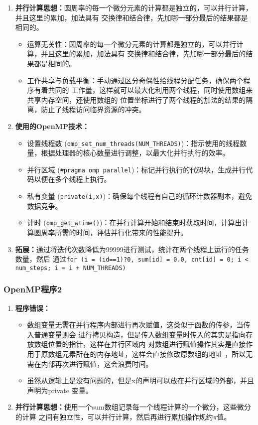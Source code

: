 \documentclass{article}
\begin{document}
\begin{enumerate}
    \item \textbf{并行计算思想：}圆周率的每一个微分元素的计算都是独立的，可以并行计算，并且这里的累加，加法具有
        交换律和结合律，先加哪一部分最后的结果都是相同的。
        \begin{itemize}
            \item 运算无关性：圆周率的每一个微分元素的计算都是独立的，可以并行计算，并且这里的累加，加法具有
            交换律和结合律，先加哪一部分最后的结果都是相同的。
            \item 工作共享与负载平衡：手动通过区分奇偶性给线程分配任务，确保两个程序有着共同的
            工作量，这样就可以最大化利用两个线程，同时使用数组来共享内存空间，还使用数组的
            位置坐标进行了两个线程的加法的结果的隔离，防止了线程访问临界资源的冲突。
        \end{itemize}
    
    \item \textbf{使用的OpenMP技术：}
    \begin{itemize}
        \item 设置线程数 (\texttt{omp\_set\_num\_threads(NUM\_THREADS)})：指示使用的线程数量，根据处理器的核心数量进行调整，以最大化并行执行的效率。
        \item 并行区域 (\texttt{\#pragma omp parallel})：标记并行执行的代码块，生成并行代码以便在多个线程上执行。
        \item 私有变量 (\texttt{private(i,x)})：确保每个线程有自己的循环计数器副本，避免数据竞争。
        \item 计时 (\texttt{omp\_get\_wtime()})：在并行计算开始和结束时获取时间，计算出计算圆周率所需的时间，评估并行化带来的性能提升。
    \end{itemize}
    \item \textbf{拓展：}通过将迭代次数降低为99999进行测试，统计在两个线程上运行的任务数量，然后
    通过\texttt{for (i = (id==1)?0, sum[id] = 0.0, cnt[id] = 0; i < num_steps; i = i + NUM\_THREADS)}
\end{enumerate}
\subsubsection{OpenMP程序2}
\begin{enumerate}
    \item \textbf{程序错误：}
    \begin{itemize}
        \item 数组变量无需在并行程序内部进行再次赋值，这类似于函数的传参，当传入普通变量则会
        进行拷贝构造，但是传入数组变量时传入的其实是指向存放数组位置的指针，这样在并行区域内
        对数组进行赋值操作其实是直接作用于原数组元素所在的内存地址，这样会直接修改原数组的地址
        ，所以无需在内部再次进行赋值，这会浪费时间。
        \item 虽然从逻辑上是没有问题的，但是x的声明可以放在并行区域的外部，并且声明为private
        变量。
    \end{itemize}
    \item \textbf{并行计算思想：}使用一个sum数组记录每一个线程计算的一个微分，这些微分的计算
    之间有独立性，可以并行计算，然后再进行累加操作规约$\pi$值。
\end{enumerate}
\end{document}
